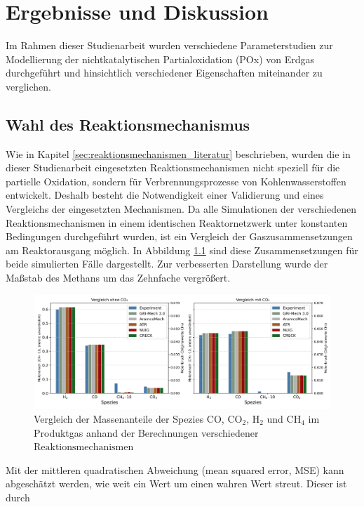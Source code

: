 
\chapter{Ergebnisse und Diskussion}
     Im Rahmen dieser Studienarbeit wurden verschiedene Parameterstudien zur Modellierung der nichtkatalytischen Partialoxidation (POx) von Erdgas durchgeführt und hinsichtlich verschiedener Eigenschaften miteinander zu verglichen. 
     \section{Wahl des Reaktionsmechanismus}
        \label{sec:auswertung_mechanismus}
        Wie in Kapitel \ref{sec:reaktionsmechanismen_literatur} beschrieben, wurden die in dieser Studienarbeit eingesetzten Reaktionsmechanismen nicht speziell für die partielle Oxidation, sondern für Verbrennungsprozesse von Kohlenwasserstoffen entwickelt. Deshalb besteht die Notwendigkeit einer Validierung und eines Vergleichs der eingesetzten Mechanismen.
        Da alle Simulationen der verschiedenen Reaktionsmechanismen in einem identischen Reaktornetzwerk unter konstanten Bedingungen durchgeführt wurden, ist ein Vergleich der Gaszusammensetzungen am Reaktorausgang möglich. In Abbildung \ref{fig:auswertung_vergleich_exp_stoffe} sind diese Zusammensetzungen für beide simulierten Fälle dargestellt. Zur verbesserten Darstellung wurde der Maßstab des Methans um das Zehnfache vergrößert.
        \begin{figure}[H]
            \centering
            \includegraphics[width=1\linewidth]{img/Vergleich_mech/vergleich_Experimentaldaten_scaled_CH4_gap.png}
            \caption{Vergleich der Massenanteile der Spezies CO, CO$_2$, H$_2$ und CH$_4$ im Produktgas anhand der Berechnungen verschiedener $\mbox{Reaktionsmechanismen}$}
            \label{fig:auswertung_vergleich_exp_stoffe}
        \end{figure}
        Mit der mittleren quadratischen Abweichung (mean squared error, MSE) kann abgeschätzt werden, wie weit ein Wert um einen wahren Wert streut. Dieser ist durch 
